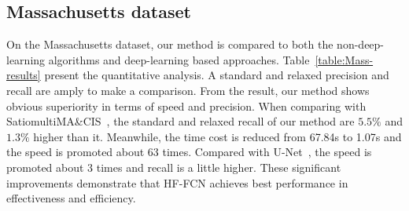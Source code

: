 \subsection{Massachusetts dataset}
On the Massachusetts dataset, our method is compared to both the non-deep-learning algorithms and deep-learning based approaches. Table~\ref{table:Mass-results} present the quantitative analysis. A standard and relaxed precision and recall are amply to make a comparison.
From the result, our method shows obvious superiority in terms of speed and precision. When comparing with Satio\-multi\-MA\&CIS~\cite{IEEEexample:saito2016multiple}, the standard and relaxed recall of our method are $5.5\%$ and $1.3\%$ higher than it. Meanwhile, the time cost is reduced from 67.84s to 1.07s and the speed is promoted about 63 times.
Compared with U-Net~\cite{IEEEexample:ronneberger2015u}, the speed is promoted about 3 times and recall is a little higher.
These significant improvements demonstrate that HF-FCN achieves best performance in effectiveness and efficiency.

